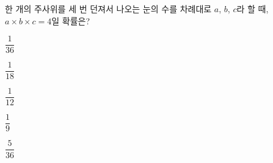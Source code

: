 한 개의 주사위를 세 번 던져서 나오는 눈의 수를 차례대로 $a$, $b$, $c$라 할 때, $a\times b\times c=4$일 확률은?
\begin{choices32}{\rule[-3ex]{0pt}{8ex}$\dfrac{1}{36}$}{\rule[-3ex]{0pt}{8ex}$\dfrac{1}{18}$}{\rule[-3ex]{0pt}{8ex}$\dfrac{1}{12}$}{\rule[-3ex]{0pt}{8ex}$\dfrac{1}{9}$}{\rule[-3ex]{0pt}{8ex}$\dfrac{5}{36}$}\end{choices32}
